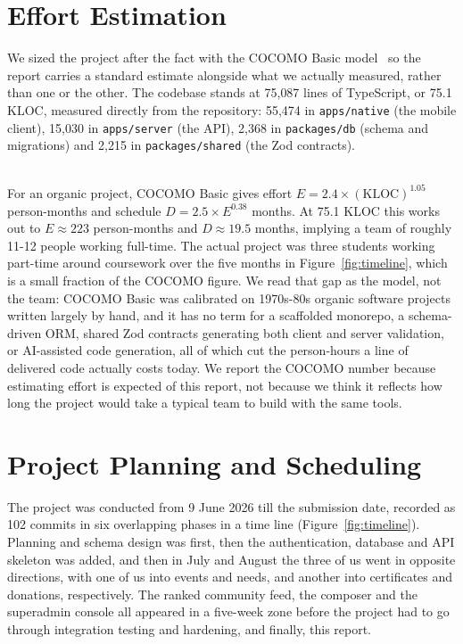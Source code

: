 \section{Effort Estimation}
\label{sec:effort-estimation}
We sized the project after the fact with the COCOMO Basic model~\cite{boehm1981} so the report carries a standard estimate alongside what we actually measured, rather than one or the other. The codebase stands at 75{,}087 lines of TypeScript, or 75.1 KLOC, measured directly from the repository: 55{,}474 in \texttt{apps/native} (the mobile client), 15{,}030 in \texttt{apps/server} (the API), 2{,}368 in \texttt{packages/db} (schema and migrations) and 2{,}215 in \texttt{packages/shared} (the Zod contracts).

\noindent \\ For an organic project, COCOMO Basic gives effort $E = 2.4 \times (\text{KLOC})^{1.05}$ person-months and schedule $D = 2.5 \times E^{0.38}$ months. At 75.1 KLOC this works out to $E \approx 223$ person-months and $D \approx 19.5$ months, implying a team of roughly 11-12 people working full-time. The actual project was three students working part-time around coursework over the five months in Figure~\ref{fig:timeline}, which is a small fraction of the COCOMO figure. We read that gap as the model, not the team: COCOMO Basic was calibrated on 1970s-80s organic software projects written largely by hand, and it has no term for a scaffolded monorepo, a schema-driven ORM, shared Zod contracts generating both client and server validation, or AI-assisted code generation, all of which cut the person-hours a line of delivered code actually costs today. We report the COCOMO number because estimating effort is expected of this report, not because we think it reflects how long the project would take a typical team to build with the same tools.

\section{Project Planning and Scheduling}
\label{sec:planning}
The project was conducted from 9 June 2026 till the submission date, recorded as 102 commits in six overlapping phases in a time line (Figure~\ref{fig:timeline}). Planning and schema design was first, then the authentication, database and API skeleton was added, and then in July and August the three of us went in opposite directions, with one of us into events and needs, and another into certificates and donations, respectively. The ranked community feed, the composer and the superadmin console all appeared in a five-week zone before the project had to go through integration testing and hardening, and finally, this report.

